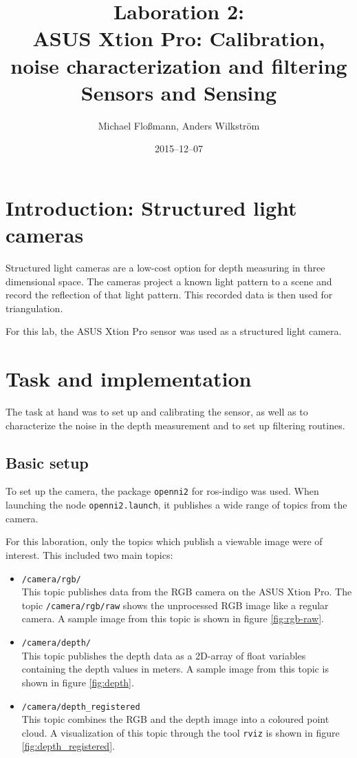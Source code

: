 \documentclass[DIV12,a4paper]{scrartcl}
\title{Laboration 2:\\ ASUS Xtion Pro: Calibration, noise characterization and filtering\\{\small Sensors and Sensing}}
\author{Michael Flo{\ss}mann, Anders Wilkstr\"om}
\date{2015--12--07}
\begin{document}
\maketitle

\section{Introduction: Structured light cameras}
Structured light cameras are a low-cost option for depth measuring in three dimensional space. The cameras project a known light pattern to a scene and record the reflection of that light pattern. This recorded data is then used for triangulation.\par
For this lab, the ASUS Xtion Pro sensor was used as a structured light camera.
\section{Task and implementation}
The task at hand was to set up and calibrating the sensor, as well as to characterize the noise in the depth measurement and to set up filtering routines.
\subsection{Basic setup}
To set up the camera, the package \texttt{openni2} for ros-indigo was used. When launching the node \texttt{openni2.launch}, it publishes a wide range of topics from the camera.\par %
For this laboration, only the topics which publish a viewable image were of interest. This included two main topics:%

\begin{itemize}
  \item \texttt{/camera/rgb/}\\
    This topic publishes data from the RGB camera on the ASUS Xtion Pro. The topic \texttt{/camera/rgb/raw} shows the unprocessed RGB image like a regular camera. A sample image from this topic is shown in figure \ref{fig:rgb-raw}.
  \item \texttt{/camera/depth/}\\
    This topic publishes the depth data as a 2D-array of float variables containing the depth values in meters. A sample image from this topic is shown in figure \ref{fig:depth}.
  \item \texttt{/camera/depth\_registered}\\
    This topic combines the RGB and the depth image into a coloured point cloud. A visualization of this topic through the tool \texttt{rviz} is shown in figure \ref{fig:depth_registered}.
\end{itemize}
\end{document}
